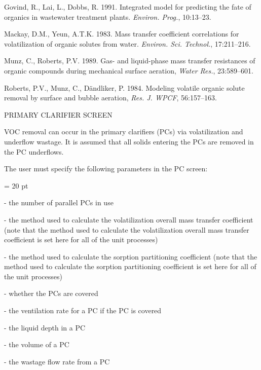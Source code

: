 Govind, R., Lai, L., Dobbs, R. 1991. Integrated model for predicting the fate
of organics in wastewater treatment plants. {\it Environ. Prog.}, 10:13--23.

Mackay, D.M., Yeun, A.T.K. 1983. Mass transfer coefficient correlations for
volatilization of organic solutes from water. {\it Environ. Sci. Technol.},
17:211--216. 

Munz, C., Roberts, P.V. 1989. Gas- and liquid-phase mass transfer resistances
of organic compounds during mechanical surface aeration, {\it Water Res.},
23:589--601.

Roberts, P.V., Munz, C., D\"andliker, P. 1984. Modeling volatile organic solute
removal by surface and bubble aeration, {\it Res. J. WPCF}, 56:157--163.





\newpage

PRIMARY CLARIFIER SCREEN

VOC removal can occur in the primary clarifiers (PCs) via volatilization and
underflow wastage.  It is assumed that all solids entering the PCs are removed
in the PC underflows.

The user must specify the following parameters in the PC screen:

{\parindent = 20 pt

\item{-} the number of parallel PCs in use

\item{-} the method used to calculate the volatilization overall mass transfer
coefficient (note that the method used to calculate the volatilization overall
mass transfer coefficient is set here for all of the unit processes)

\item{-} the method used to calculate the sorption partitioning coefficient
(note that the method used to calculate the sorption partitioning coefficient
is set here for all of the unit processes)

\item{-} whether the PCs are covered 

\item{-} the ventilation rate for a PC if the PC is covered

\item{-} the liquid depth in a PC

\item{-} the volume of a PC

\item{-} the wastage flow rate from a PC 

}

